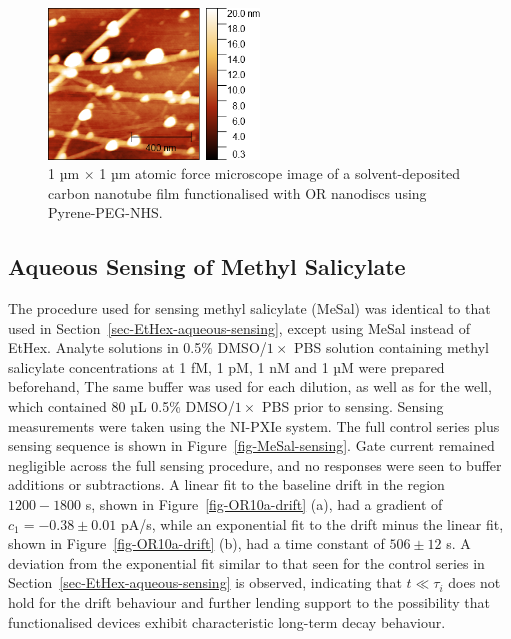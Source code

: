 \documentclass[
  a4paper,
]{scrbook}
\begin{document}
\begin{figure}

{\centering \includegraphics[width=0.5\textwidth,height=\textheight]{figures/ch8/Ned_funcverification_PPNHSwamine_R_1um_20220414_00466.png}

}

\caption{\label{fig-PPN-linker}1 µm \(\times\) 1 µm atomic force
microscope image of a solvent-deposited carbon nanotube film
functionalised with OR nanodiscs using Pyrene-PEG-NHS.}

\end{figure}

\hypertarget{sec-MeSal-aqueous-sensing}{%
\subsection{Aqueous Sensing of Methyl
Salicylate}\label{sec-MeSal-aqueous-sensing}}

The procedure used for sensing methyl salicylate (MeSal) was identical
to that used in Section~\ref{sec-EtHex-aqueous-sensing}, except using
MeSal instead of EtHex. Analyte solutions in 0.5\% DMSO/\(1 \times\) PBS
solution containing methyl salicylate concentrations at 1 fM, 1 pM, 1 nM
and 1 µM were prepared beforehand, The same buffer was used for each
dilution, as well as for the well, which contained 80 µL 0.5\%
DMSO/\(1 \times\) PBS prior to sensing. Sensing measurements were taken
using the NI-PXIe system. The full control series plus sensing sequence
is shown in Figure~\ref{fig-MeSal-sensing}. Gate current remained
negligible across the full sensing procedure, and no responses were seen
to buffer additions or subtractions. A linear fit to the baseline drift
in the region \(1200-1800\) s, shown in Figure~\ref{fig-OR10a-drift}
(a), had a gradient of \(c_1 = -0.38\pm0.01\) pA/s, while an exponential
fit to the drift minus the linear fit, shown in
Figure~\ref{fig-OR10a-drift} (b), had a time constant of \(506 \pm 12\)
s. A deviation from the exponential fit similar to that seen for the
control series in Section~\ref{sec-EtHex-aqueous-sensing} is observed,
indicating that \(t\ll\tau_i\) does not hold for the drift behaviour and
further lending support to the possibility that functionalised devices
exhibit characteristic long-term decay behaviour.
\end{document}
